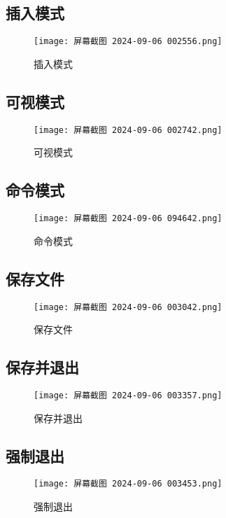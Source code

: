 \documentclass[a4paper, 12pt]{article}
\begin{document}
\subsection{插入模式}
\begin{figure}[H]
    \centering
    \texttt{[image: 屏幕截图 2024-09-06 002556.png]}
    \caption{插入模式}
    \label{fig:insert_mode}
\end{figure}

\subsection{可视模式}
\begin{figure}[H]
    \centering
    \texttt{[image: 屏幕截图 2024-09-06 002742.png]}
    \caption{可视模式}
    \label{fig:visual_mode}
\end{figure}

\subsection{命令模式}
\begin{figure}[H]
    \centering
    \texttt{[image: 屏幕截图 2024-09-06 094642.png]}
    \caption{命令模式}
    \label{fig:command_mode}
\end{figure}

\subsection{保存文件}
\begin{figure}[H]
    \centering
    \texttt{[image: 屏幕截图 2024-09-06 003042.png]}
    \caption{保存文件}
    \label{fig:save_file}
\end{figure}

\subsection{保存并退出}
\begin{figure}[H]
    \centering
    \texttt{[image: 屏幕截图 2024-09-06 003357.png]}
    \caption{保存并退出}
    \label{fig:save_and_exit}
\end{figure}

\subsection{强制退出}
\begin{figure}[H]
    \centering
    \texttt{[image: 屏幕截图 2024-09-06 003453.png]}
    \caption{强制退出}
    \label{fig:force_exit}
\end{figure}
\end{document}
